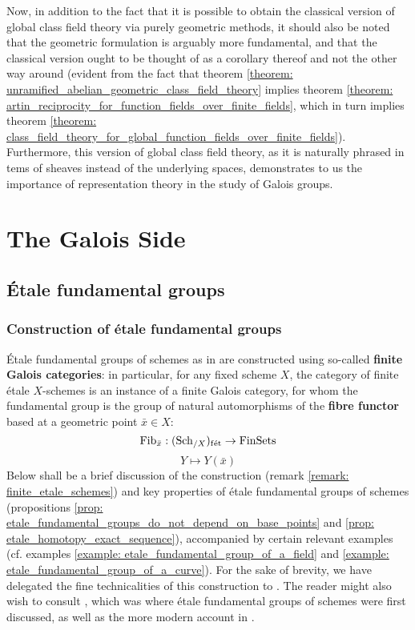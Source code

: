         Now, in addition to the fact that it is possible to obtain the classical version of global class field theory via purely geometric methods, it should also be noted that the geometric formulation is arguably more fundamental, and that the classical version ought to be thought of as a corollary thereof and not the other way around (evident from the fact that theorem \ref{theorem: unramified_abelian_geometric_class_field_theory} implies theorem \ref{theorem: artin_reciprocity_for_function_fields_over_finite_fields}, which in turn implies theorem \ref{theorem: class_field_theory_for_global_function_fields_over_finite_fields}). Furthermore, this version of global class field theory, as it is naturally phrased in tems of sheaves instead of the underlying spaces, demonstrates to us the importance of representation theory in the study of Galois groups.

    \section{The Galois Side}
        \subsection{\'Etale fundamental groups}
            \subsubsection{Construction of \'etale fundamental groups}
                \'Etale fundamental groups of schemes as in \cite[Expos\'e V]{SGA1} are constructed using so-called \textbf{finite Galois categories}: in particular, for any fixed scheme $X$, the category of finite \'etale $X$-schemes is an instance of a finite Galois category, for whom the fundamental group is the group of natural automorphisms of the \textbf{fibre functor} based at a geometric point $\bar{x} \in X$:
                    $$\mathrm{Fib}_{\bar{x}}: (\mathrm{Sch}_{/X})_{\mathrm{f\acute{e}t}} \to \mathrm{Fin}\mathrm{Sets}$$
                    $$Y \mapsto Y(\bar{x})$$
                Below shall be a brief discussion of the construction (remark \ref{remark: finite_etale_schemes}) and key properties of \'etale fundamental groups of schemes (propositions \ref{prop: etale_fundamental_groups_do_not_depend_on_base_points} and \ref{prop: etale_homotopy_exact_sequence}), accompanied by certain relevant examples (cf. examples \ref{example: etale_fundamental_group_of_a_field} and \ref{example: etale_fundamental_group_of_a_curve}). For the sake of brevity, we have delegated the fine technicalities of this construction to \cite{}. The reader might also wish to consult \cite[Expos\'e V]{SGA1}, which was where \'etale fundamental groups of schemes were first discussed, as well as the more modern account in \cite[\href{https://stacks.math.columbia.edu/tag/0BQ6}{Tag 0BQ6}]{stacks}.
                

